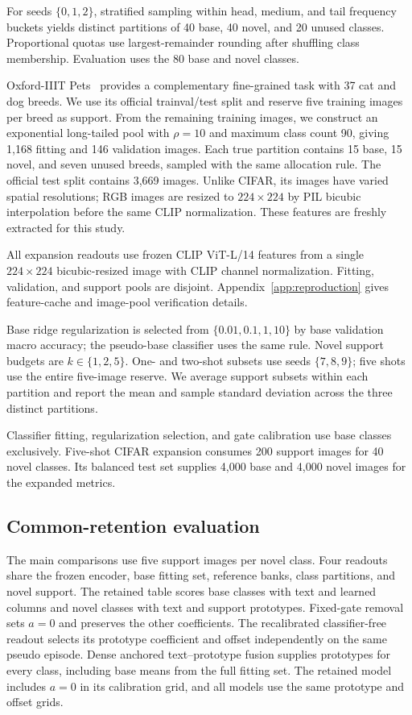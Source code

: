 \documentclass[research]{fcs}
\begin{document}
For seeds $\{0,1,2\}$, stratified sampling within head, medium, and tail frequency buckets yields distinct partitions of 40 base, 40 novel, and 20 unused classes. Proportional quotas use largest-remainder rounding after shuffling class membership. Evaluation uses the 80 base and novel classes.

Oxford-IIIT Pets~\cite{parkhi2012cats} provides a complementary fine-grained task with 37 cat and dog breeds. We use its official trainval/test split and reserve five training images per breed as support. From the remaining training images, we construct an exponential long-tailed pool with $\rho=10$ and maximum class count 90, giving 1,168 fitting and 146 validation images. Each true partition contains 15 base, 15 novel, and seven unused breeds, sampled with the same allocation rule. The official test split contains 3,669 images. Unlike CIFAR, its images have varied spatial resolutions; RGB images are resized to $224\times224$ by PIL bicubic interpolation before the same CLIP normalization. These features are freshly extracted for this study.

All expansion readouts use frozen CLIP ViT-L/14 features from a single $224\times224$ bicubic-resized image with CLIP channel normalization. Fitting, validation, and support pools are disjoint. Appendix~\ref{app:reproduction} gives feature-cache and image-pool verification details.

Base ridge regularization is selected from $\{0.01,0.1,1,10\}$ by base validation macro accuracy; the pseudo-base classifier uses the same rule. Novel support budgets are $k\in\{1,2,5\}$. One- and two-shot subsets use seeds $\{7,8,9\}$; five shots use the entire five-image reserve. We average support subsets within each partition and report the mean and sample standard deviation across the three distinct partitions.

Classifier fitting, regularization selection, and gate calibration use base classes exclusively. Five-shot CIFAR expansion consumes 200 support images for 40 novel classes. Its balanced test set supplies 4,000 base and 4,000 novel images for the expanded metrics.

\subsection{Common-retention evaluation}
The main comparisons use five support images per novel class. Four readouts share the frozen encoder, base fitting set, reference banks, class partitions, and novel support. The retained table scores base classes with text and learned columns and novel classes with text and support prototypes. Fixed-gate removal sets $a=0$ and preserves the other coefficients. The recalibrated classifier-free readout selects its prototype coefficient and offset independently on the same pseudo episode. Dense anchored text--prototype fusion supplies prototypes for every class, including base means from the full fitting set. The retained model includes $a=0$ in its calibration grid, and all models use the same prototype and offset grids.
\end{document}
